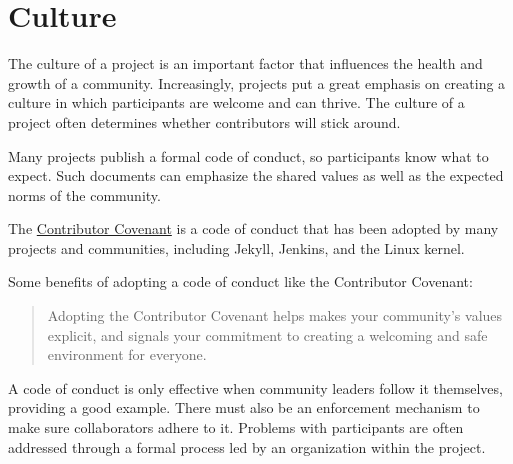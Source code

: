 


\chapter{Culture}

The culture of a project is an important factor that influences the health and growth of a community.  Increasingly, projects put a great emphasis on creating a culture in which participants are welcome and can thrive.  The culture of a project often determines whether contributors will stick around.

Many projects publish a formal code of conduct, so participants know what to expect.  Such documents can emphasize the shared values as well as the expected norms of the community.

The \href{https://www.contributor-covenant.org/}{Contributor Covenant} is a code of conduct that has been adopted by many projects and communities, including Jekyll, Jenkins, and the Linux kernel.

\begin{kaobox}[frametitle=Contributor Covenant]

Some benefits of adopting a code of conduct like the Contributor Covenant:

\begin{quote}

Adopting the Contributor Covenant helps makes your community's values explicit, and signals your commitment to creating a welcoming and safe environment for everyone.

\end{quote}

\end{kaobox}

A code of conduct is only effective when community leaders follow it themselves, providing a good example.  There must also be an enforcement mechanism to make sure collaborators adhere to it.  Problems with participants are often addressed through a formal process led by an organization within the project.

